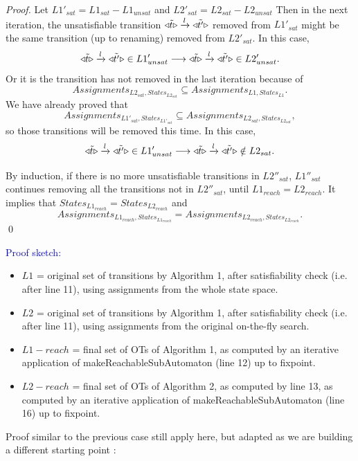 \documentclass[smallcondensed]{svjour3}
\newcommand{\ERIC}[1]{\textcolor{blue}{#1}}
\begin{document}
\begin{proof}
Let $L1'_{sat}=L1_{sat}-L1_{unsat}$ and $L2'_{sat}=L2_{sat}-L2_{unsat}$
Then in the next iteration, the unsatisfiable transition $\triangleleft{\tilde{t}}\triangleright\xrightarrow{l}\triangleleft{\tilde{t'}}\triangleright$ removed from $L1'_{sat}$ might be the same transition (up to renaming) removed from $L2'_{sat}$. In this case,
\[\triangleleft{\tilde{t}}\triangleright\xrightarrow{l}\triangleleft{\tilde{t'}}\triangleright\in L1'_{unsat} \longrightarrow \triangleleft{\tilde{t}}\triangleright\xrightarrow{l}\triangleleft{\tilde{t'}}\triangleright\in L2'_{unsat}.\]
Or it is the transition has not removed in the last iteration because of 
\[Assignments_{L2_{sat}, States_{L2_{sat}}}\subseteq Assignments_{L1, States_{L1}}.\] 
We have already proved that 
\[Assignments_{L1'_{sat}, States_{L1'_{sat}}}\subseteq Assignments_{L2_{sat}, States_{L2_{sat}}},\]
so those transitions will be removed this time. In this case,
\[\triangleleft{\tilde{t}}\triangleright\xrightarrow{l}\triangleleft{\tilde{t'}}\triangleright\in L1'_{unsat} \longrightarrow \triangleleft{\tilde{t}}\triangleright\xrightarrow{l}\triangleleft{\tilde{t'}}\triangleright\notin L2_{sat}.\]

By induction, if there is no more unsatisfiable transitions in $L2''_{sat}$, $L1''_{sat}$ continues removing all the transitions not in $L2''_{sat}$, until $L1_{reach}=L2_{reach}$. It implies that $States_{L1_{reach}}=States_{L2_{reach}}$ and
$$Assignments_{L1_{reach},States_{L1_{reach}}}=Assignments_{L2_{reach},States_{L2_{reach}}}.$$
\hfill\qed
\end{proof}

\ERIC{Proof sketch:}
  
  \begin{itemize}
   \item $L1$ = original set of transitions by Algorithm 1, after
      satisfiability check (i.e. after line 11), using assignments
      from the whole state space.
   \item $L2$ = original set of transitions by Algorithm 1, after
      satisfiability check (i.e. after line 11), using assignments
      from the original on-the-fly search.

    \item $L1-reach$ = final set of OTs of Algorithm 1, as computed
        by an iterative application of makeReachableSubAutomaton (line
        12) up to fixpoint.
      \item $L2-reach$ = final set of OTs of Algorithm 2, as computed
          by line 13, as computed
        by an iterative application of makeReachableSubAutomaton (line
        16) up to fixpoint.
  \end{itemize}

  Proof similar to the previous case still apply here, but adapted as
  we are building a different starting point :
  
\end{document}
